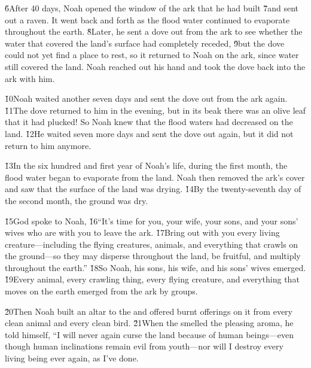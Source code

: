 \v{6}After 40 days, Noah opened the window of the ark that he had built \v{7}and sent out a raven. It went back and forth as the flood water continued to evaporate throughout the earth. \v{8}Later, he sent a dove out from the ark to see whether the water that covered the land's surface had completely receded, \v{9}but the dove could not yet find a place to rest, so it returned to Noah on the ark, since water still covered the land. Noah reached out his hand and took the dove back into the ark with him.

\v{10}Noah waited another seven days and sent the dove out from the ark again. \v{11}The dove returned to him in the evening, but in its beak there was an olive leaf that it had plucked! So Noah knew that the flood waters had decreased on the land. \v{12}He waited seven more days and sent the dove out again, but it did not return to him anymore.

\v{13}In the six hundred and first year of Noah's life, during the first month, the flood water began to evaporate from the land. Noah then removed the ark's cover and saw that the surface of the land was drying. \v{14}By the twenty-seventh day of the second month, the ground was dry.

\v{15}God spoke to Noah, \v{16}``It's time for you, your wife, your sons, and your sons' wives who are with you to leave the ark. \v{17}Bring out with you every living creature---including the flying creatures, animals, and everything that crawls on the ground---so they may disperse throughout the land, be fruitful, and multiply throughout the earth.'' \v{18}So Noah, his sons, his wife, and his sons' wives emerged. \v{19}Every animal, every crawling thing, every flying creature, and everything that moves on the earth emerged from the ark by groups.

\v{20}Then Noah built an altar to the  and offered burnt offerings on it from every clean animal and every clean bird. \v{21}When the  smelled the pleasing aroma, he told himself, ``I will never again curse the land because of human beings---even though human inclinations remain evil from youth---nor will I destroy every living being ever again, as I've done.

